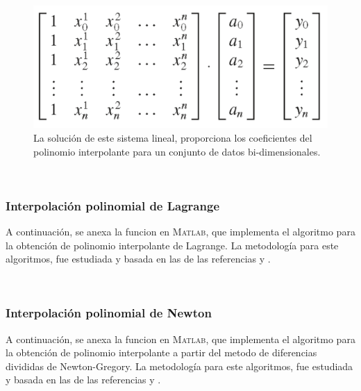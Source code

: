 \documentclass[11pt, spanish]{article}
\begin{document}
\begin{figure}[H]
\centering
	\includegraphics[scale=0.4]{data/img/system}
	\caption{La solución de este sistema lineal, proporciona los coeficientes del polinomio interpolante para un conjunto de datos bi-dimensionales.}
\end{figure}

\

\subsubsection{Interpolación polinomial de Lagrange}

A continuación, se anexa la funcion en \textsc{Matlab}, que implementa el algoritmo para la obtención de polinomio interpolante de Lagrange. La metodología para este algoritmos, fue estudiada y basada en las de las referencias \cite{yang2005applied} y \cite{burden2010numerical}.

\

\subsubsection{Interpolación polinomial de Newton}

A continuación, se anexa la funcion en \textsc{Matlab}, que implementa el algoritmo para la obtención de polinomio interpolante a partir del metodo de diferencias divididas de Newton-Gregory. La metodología para este algoritmos, fue estudiada y basada en las de las referencias \cite{yang2005applied} y \cite{burden2010numerical}.

\
\end{document}
